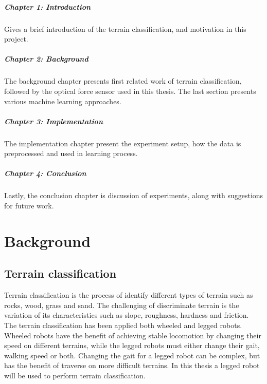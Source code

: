 \documentclass[USenglish]{ifimaster}  %
\begin{document}
\paragraph{Chapter 1: Introduction}
Gives a brief introduction of the terrain classification, and motivation in this project.

\paragraph{Chapter 2: Background}
The background chapter presents first related work of terrain classification, followed by the optical force sensor used in this thesis. The last section presents various machine learning approaches.

\paragraph{Chapter 3: Implementation}
The implementation chapter present the experiment setup, how the data is preprocessed and used in learning process.

\paragraph{Chapter 4: Conclusion}
Lastly, the conclusion chapter is discussion of experiments, along with suggestions for future work.


\chapter{Background}                  %

\section{Terrain classification}
Terrain classification is the process of identify different types of terrain such as rocks, wood, grass and sand. The challenging of discriminate terrain is the variation of its characteristics such as slope, roughness, hardness and friction. The terrain classification has been applied both wheeled and legged robots. Wheeled robots have the benefit of achieving stable locomotion by changing their speed on different terrains, while the legged robots must either change their gait, walking speed or both. Changing the gait for a legged robot can be complex, but has the benefit of traverse on more difficult terrains. In this thesis a legged robot will be used to perform terrain classification.
\end{document}
